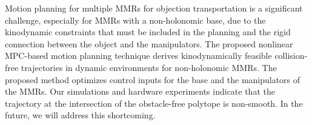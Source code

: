 Motion planning for multiple MMRs for objection transportation is a significant challenge, especially for MMRs with a non-holonomic base, due to the kinodynamic constraints that must be included in the planning and the rigid connection between the object and the manipulators. The proposed nonlinear MPC-based motion planning technique derives kinodynamically feasible collision-free trajectories in dynamic environments for non-holonomic MMRs. The proposed method optimizes control inputs for the base and the manipulators of the MMRs. Our simulations and hardware experiments indicate that the trajectory at the intersection of the obstacle-free polytope is non-smooth. In the future, we will address this shortcoming.